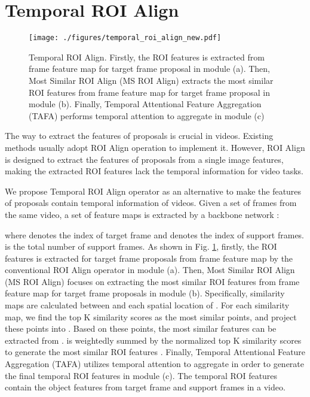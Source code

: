\documentclass[letterpaper]{article} \usepackage{aaai21}  \usepackage{times}  \usepackage{helvet} \usepackage{courier}  \usepackage[hyphens]{url}  \usepackage{graphicx} \usepackage{hyperref}
\begin{document}
\section{Temporal ROI Align}

\begin{figure}[t]
\centering
\texttt{[image: ./figures/temporal\_roi\_align\_new.pdf]}
\vspace{-0.6cm}
\caption{Temporal ROI Align. Firstly, the ROI features  is extracted from  frame feature map  for target frame proposal in module (a). Then, Most Similar ROI Align (MS ROI Align) extracts the most similar ROI features  from  frame feature map  for target frame proposal in module (b). Finally, Temporal Attentional Feature Aggregation (TAFA) performs temporal attention to aggregate  in module (c)
}
\label{fig:method}
\vspace{-0.25cm}
\end{figure}

The way to extract the features of proposals is crucial in videos. Existing methods usually adopt ROI Align operation to implement it. However, ROI Align is designed to extract the features of proposals from a single image features, making the extracted ROI features lack the temporal information for video tasks.

We propose Temporal ROI Align operator as an alternative to make the features of proposals contain temporal information of videos. Given a set of frames  from the same video, a set of feature maps  is extracted by a backbone network :

where  denotes the index of target frame and   denotes the index of support frames.  is the total number of support frames. As shown in Fig. \ref{fig:method}, firstly, the ROI features  is extracted for target frame proposals from  frame feature map  by the conventional ROI Align operator in module (a). Then, Most Similar ROI Align (MS ROI Align) focuses on extracting the most similar ROI features  from  frame feature map  for target frame proposals in module (b). Specifically, similarity maps are calculated between  and each spatial location of . For each similarity map, we find the top K similarity scores as the most similar points, and project these points into . Based on these points, the most similar features   can be extracted from .  is weightedly summed by the normalized top K similarity scores to generate the most similar ROI features . Finally, Temporal Attentional Feature Aggregation (TAFA) utilizes temporal attention to aggregate  in order to generate the final temporal ROI features  in module (c). The temporal ROI features  contain the object features from target frame and support frames in a video.
\end{document}
